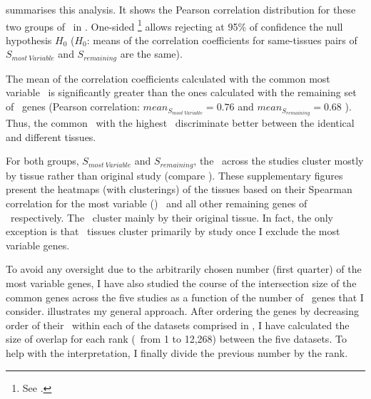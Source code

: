  summarises this analysis.
It shows the Pearson correlation distribution
for these two groups of \pcgs\ in \setOne.
One-sided \Welchttest\footnote{See .}
allows rejecting at 95\% of confidence the null hypothesis $H_0$
($H_0$: means of the correlation coefficients for
same-tissues pairs of $S_{most~Variable}$ and $S_{remaining}$ are the same).\mybr\

The mean of the %
correlation coefficients
calculated with the common most variable \pcgs\ is significantly greater than
the ones calculated with the remaining set of \setOne\ genes%
 (Pearson correlation:
$mean_{S_{most~Variable}}=0.76$ and $mean_{S_{remaining}}=0.68$
).
Thus, the common \pcgs\ with the highest \cv\
discriminate better between the identical and different tissues.\mybr\

For both groups,
$S_{most~Variable}$ and $S_{remaining}$,
the \treps\ across the studies cluster mostly by tissue rather than
original study (compare ).
These supplementary figures present
the heatmaps (with clusterings) of the tissues
based on their Spearman correlation for the most variable (\cv) \pcgs\
and all other remaining genes of \setOne\ respectively.
The \treps\ cluster mainly by their original tissue.
In fact, the only exception is that
\castle\ tissues cluster primarily by study
once I exclude the most variable genes.\mybr\

To avoid any oversight due to the arbitrarily chosen number (first quarter)
of the most variable genes,
I have also studied the course of the intersection size of the common genes
across the five studies
as a function of the number of \setOne\ genes that I consider.
 illustrates my general approach.
After ordering the genes by decreasing order of their \cv\
within each of the datasets comprised in \setOne,
I have calculated the size of overlap for each rank (\ie\ from 1 to 12,268)
between the five datasets.
To help with the interpretation,
I finally divide the previous number by the rank.\mybr\

